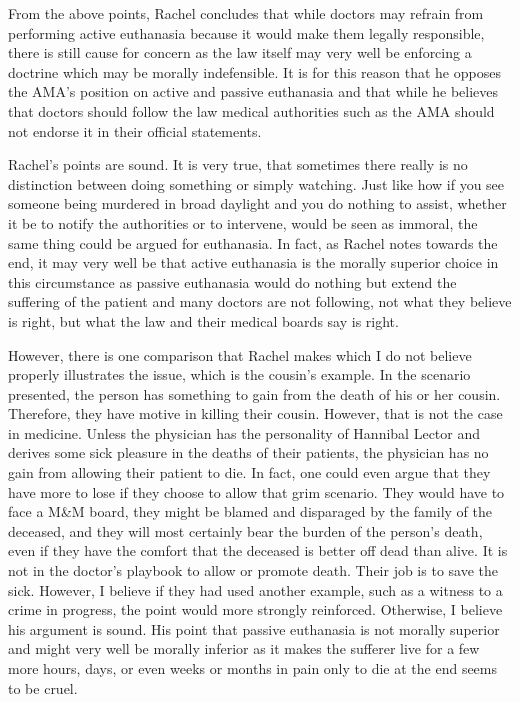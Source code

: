\documentclass{article}
\begin{document}
From the above points, Rachel concludes that while doctors may refrain from performing
active euthanasia because it would make them legally responsible, there is still cause
for concern as the law itself may very well be enforcing a doctrine which may be morally
indefensible. It is for this reason that he opposes the AMA's position on active and
passive euthanasia and that while he believes that doctors should follow the law
medical authorities such as the AMA should not endorse it in their official statements.

Rachel's points are sound. It is very true, that sometimes there really is no
distinction between doing something or simply watching. Just like how if you see someone
being murdered in broad daylight and you do nothing to assist, whether it be to notify
the authorities or to intervene, would be seen as immoral, the same thing could be argued
for euthanasia. In fact, as Rachel notes towards the end, it may very well be that active
euthanasia is the morally superior choice in this circumstance as passive euthanasia
would do nothing but extend the suffering of the patient and many doctors are not following,
not what they believe is right, but what the law and their medical boards say is right.

However, there is one comparison that Rachel makes which I do not believe properly
illustrates the issue, which is the cousin's example. In the scenario presented, the
person has something to gain from the death of his or her cousin. Therefore, they have
motive in killing their cousin. However, that is not the case in medicine. Unless the
physician has the personality of Hannibal Lector and derives some sick pleasure in
the deaths of their patients, the physician has no gain from allowing their patient to
die. In fact, one could even argue that they have more to lose if they choose to allow
that grim scenario. They would have to face a M\&M board, they might be blamed and 
disparaged by the family of the deceased, and they will most certainly bear the burden
of the person's death, even if they have the comfort that the deceased is better off dead
than alive. It is not in the doctor's playbook to allow or promote death. Their job
is to save the sick. However, I believe if they had used another example, such as a
witness to a crime in progress, the point would more strongly reinforced. Otherwise,
I believe his argument is sound. His point that passive euthanasia is not morally superior
and might very well be morally inferior as it makes the sufferer live for a few more
hours, days, or even weeks or months in pain only to die at the end seems to be cruel.
\end{document}
